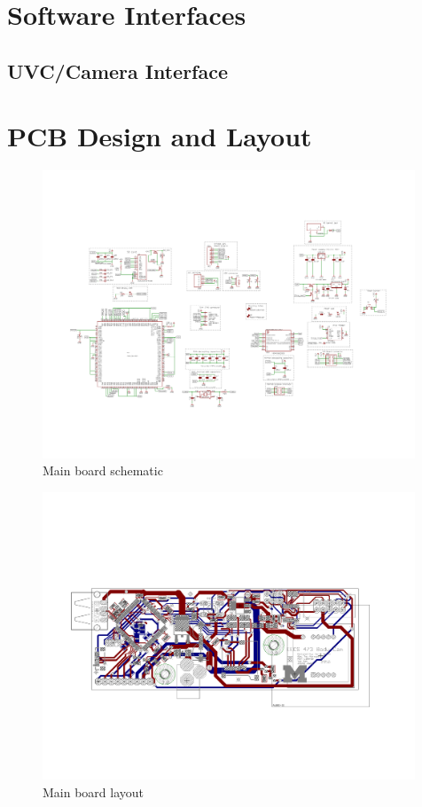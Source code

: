 \documentclass[12pt]{article}
\begin{document}
\newpage

\section{Software Interfaces}

\subsection{UVC/Camera Interface}


\newpage

\section{PCB Design and Layout}

\begin{figure}[h]
    \centering
    \includegraphics[angle=-90,width=0.99\textwidth]{BodyCamBoard_sch}
    \caption{Main board schematic}
\end{figure}

\begin{figure}[h]
    \centering
    \includegraphics[angle=-90,width=0.99\textwidth]{BodyCamBoard_brd}
    \caption{Main board layout}
\end{figure}
\end{document}
